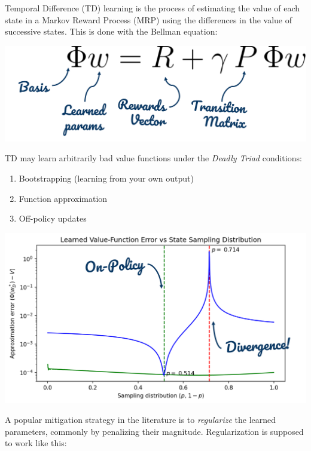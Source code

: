 
Temporal Difference (TD) learning is the process of estimating the value of each state in a Markov Reward Process (MRP) using the differences in the value of successive states. This is done with the Bellman equation:
\begin{center}
    \includegraphics[scale=0.4]{parts/intro/bellman}
\end{center}
TD may learn arbitrarily bad value functions under the \emph{Deadly Triad} conditions:
\begin{enumerate}
    \item Bootstrapping (learning from your own output)
    \item Function approximation
    \item Off-policy updates
\end{enumerate}
\begin{center}
    \includegraphics[scale=0.4]{parts/intro/threestatedivergence}
\end{center}
A popular mitigation strategy in the literature is to \emph{regularize} the learned parameters, commonly by penalizing their magnitude. Regularization is supposed to work like this:
